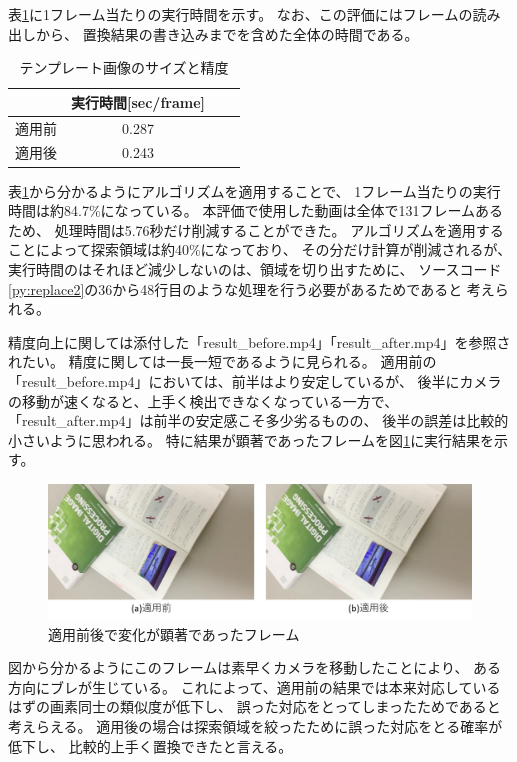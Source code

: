 表\ref{tb:apply_time}に1フレーム当たりの実行時間を示す。
なお、この評価にはフレームの読み出しから、
置換結果の書き込みまでを含めた全体の時間である。
\begin{table}[h]
    \centering
    \caption{テンプレート画像のサイズと精度}
    \label{tb:apply_time}
    \begin{tabular}{lccc} \hline \hline
         & 実行時間[sec/frame] \\ \hline
        適用前 & 0.287 \\
        適用後 &  0.243 \\ \hline
    \end{tabular}
\end{table}
表\ref{tb:apply_time}から分かるようにアルゴリズムを適用することで、
1フレーム当たりの実行時間は約84.7\%になっている。
本評価で使用した動画は全体で131フレームあるため、
処理時間は5.76秒だけ削減することができた。
アルゴリズムを適用することによって探索領域は約40\%になっており、
その分だけ計算が削減されるが、
実行時間のはそれほど減少しないのは、領域を切り出すために、
ソースコード\ref{py:replace2}の36から48行目のような処理を行う必要があるためであると
考えられる。

精度向上に関しては添付した「result\_before.mp4」「result\_after.mp4」を参照されたい。
精度に関しては一長一短であるように見られる。
適用前の「result\_before.mp4」においては、前半はより安定しているが、
後半にカメラの移動が速くなると、上手く検出できなくなっている一方で、
「result\_after.mp4」は前半の安定感こそ多少劣るものの、
後半の誤差は比較的小さいように思われる。
特に結果が顕著であったフレームを図\ref{fig:apply}に実行結果を示す。

\begin{figure}[h]
    \centering
    \includegraphics[width=1\linewidth]{fig/apply.png}
    \caption{適用前後で変化が顕著であったフレーム}
    \label{fig:apply}
\end{figure}

図から分かるようにこのフレームは素早くカメラを移動したことにより、
ある方向にブレが生じている。
これによって、適用前の結果では本来対応しているはずの画素同士の類似度が低下し、
誤った対応をとってしまったためであると考えらえる。
適用後の場合は探索領域を絞ったために誤った対応をとる確率が低下し、
比較的上手く置換できたと言える。


